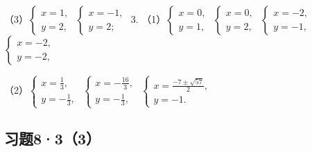 （3）\(\left\{ \begin{array}{l} x = 1, \\ y = 2, \end{array} \right.\) \(\left\{ \begin{array}{l} x = -1, \\ y = 2; \end{array} \right.\)
3.
（1）\(\left\{ \begin{array}{l} x = 0, \\ y = 1, \end{array} \right.\) \(\left\{ \begin{array}{l} x = 0, \\ y = 2, \end{array} \right.\) \(\left\{ \begin{array}{l} x = -2, \\ y = -1, \end{array} \right.\) \(\left\{ \begin{array}{l} x = -2, \\ y = -2, \end{array} \right.\)

（2）\(\left\{ \begin{array}{l} x = \frac{1}{3}, \\ y = -\frac{1}{3}, \end{array} \right.\) \(\left\{ \begin{array}{l} x = -\frac{16}{3}, \\ y = -\frac{1}{3}, \end{array} \right.\) \(\left\{ \begin{array}{l} x = \frac{-7 \pm \sqrt{57}}{2}, \\ y = -1. \end{array} \right.\)

\subsection{习题8·3（3）}


